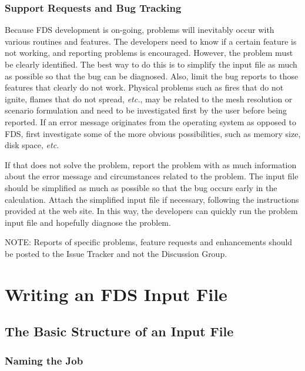 \documentclass[11pt]{book}
\begin{document}
\section{Support Requests and Bug Tracking}

Because FDS development is on-going, problems will inevitably occur
with various routines and features. The developers need to know if a certain
feature is not working, and reporting problems is encouraged. However, the
problem must be clearly identified. The best way to do this is to simplify
the input file as much as possible so that the bug can be diagnosed.
Also, limit the bug reports to those features that clearly do not work.
Physical problems such as fires that do not ignite, flames that do not
spread, {\em etc.}, may be related to the mesh resolution or scenario
formulation and need to be investigated first by the user before being
reported. If an error message originates from the operating system as
opposed to FDS, first investigate some of the more obvious possibilities,
such as memory size, disk space, {\em etc.}

If that does not solve the problem, report the problem with as much information about the error message and
circumstances related to the problem. The input file should be simplified
as much as possible so that the bug occurs early in the calculation.
Attach the simplified input file if necessary, following the instructions provided at the web site.
In this way, the developers can quickly run the problem input file and hopefully diagnose the problem.

\begin{warning}
\noindent
NOTE: Reports of specific problems, feature requests and enhancements
should be posted to the Issue Tracker and not the Discussion Group.
\end{warning}



\part{Writing an FDS Input File}
\label{info:inputfilecreation}



\chapter{The Basic Structure of an Input File}
\label{info:fdsBasic} 


\section{Naming the Job}
\end{document}
